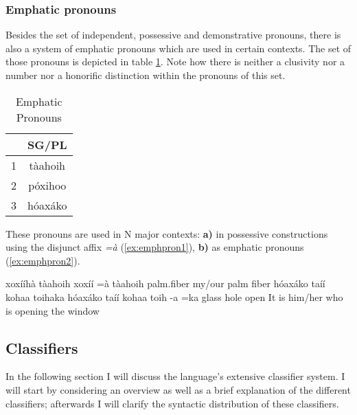 \documentclass[a4paper, 12pt, oneside]{memoir}
\newcommand{\emh}[1]{\textit{#1}}
\begin{document}
\subsubsection{Emphatic pronouns}
Besides the set of independent, possessive and demonstrative pronouns, there is also a system of emphatic pronouns which are used in certain contexts. The set of those pronouns is depicted in table \ref{t:emphpron}. Note how there is neither a clusivity nor a number nor a honorific distinction within the pronouns of this set.
\begin{table}[H]
    \begin{centering}
    \begin{tabular}{@{}lc@{}}
    \toprule
    \multicolumn{1}{c}{} & SG/PL    \\ \midrule
    1                    & tàahoih  \\
    2                    & póxihoo  \\
    3                    & hóaxáko \\ \bottomrule
    \end{tabular}
    \caption{Emphatic Pronouns}
    \label{t:emphpron}
    \end{centering}
\end{table}
These pronouns are used in N major contexts: \textbf{a)} in possessive constructions using the disjunct affix \emh{=à} (\ref{ex:emphpron1}), \textbf{b)} as emphatic pronouns (\ref{ex:emphpron2}). 
\begin{examples}
    \ex \label{ex:emphpron1}
    \words xoxííhà tàahoih
    \bits xoxíí =à tàahoih
    \gloss palm.fiber {\Link} {\Ff}
    \tr my/our palm fiber
    \ex \label{ex:emphpron2}
    \words hóaxáko taíí kohaa toihaka 
    \bits hóaxáko taíí kohaa toih -a =ka 
    \gloss {\Tt} glass hole open {\St} {\Decl}
    \tr It is him/her who is opening the window
\end{examples}
\subsection{Classifiers}\label{sclassifier}
In the following section I will discuss the language's extensive classifier system. I will start by considering an overview as well as a brief explanation of the different classifiers; afterwards I will clarify the syntactic distribution of these classifiers. 
\end{document}
